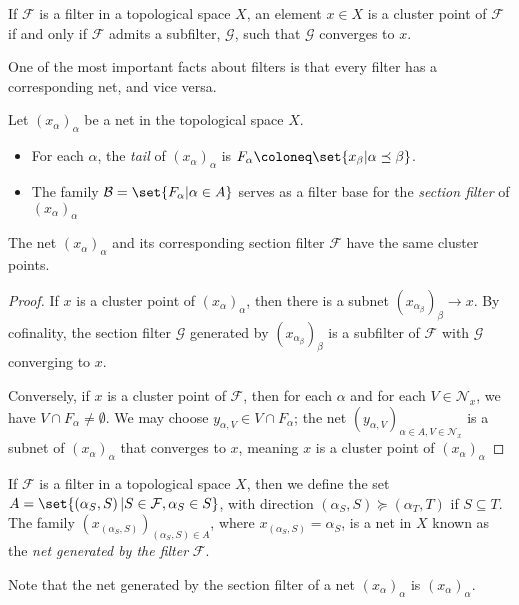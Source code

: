 \documentclass[11pt]{mypackage}
\begin{document}
\begin{theorem}
  If $\mathcal{F}$ is a filter in a topological space $X$, an element $x\in X$ is a cluster point of $\mathcal{F}$ if and only if $\mathcal{F}$ admits a subfilter, $\mathcal{G}$, such that $\mathcal{G}$ converges to $x$.
\end{theorem}
One of the most important facts about filters is that every filter has a corresponding net, and vice versa.
\begin{definition}
  Let $\left( x_{\alpha} \right)_{\alpha}$ be a net in the topological space $X$.
  \begin{itemize}
    \item For each $\alpha$, the \textit{tail} of $\left( x_{\alpha} \right)_{\alpha}$ is $F_{\alpha}\coloneq \set{x_{\beta} | \alpha\preceq \beta}$.
    \item The family $\mathcal{B} = \set{F_{\alpha} | \alpha\in A}$ serves as a filter base for the \textit{section filter} of $\left( x_{\alpha} \right)_{\alpha}$
  \end{itemize}
\end{definition}
\begin{theorem}
  The net $\left( x_{\alpha} \right)_{\alpha}$ and its corresponding section filter $\mathcal{F}$ have the same cluster points.
\end{theorem}
\begin{proof}
  If $x$ is a cluster point of $\left( x_{\alpha} \right)_{\alpha}$, then there is a subnet $\left( x_{\alpha_{\beta}} \right)_{\beta}\rightarrow x$. By cofinality, the section filter $\mathcal{G}$ generated by $\left( x_{\alpha_{\beta}} \right)_{\beta}$ is a subfilter of $\mathcal{F}$ with $\mathcal{G}$ converging to $x$.\newline

  Conversely, if $x$ is a cluster point of $\mathcal{F}$, then for each $\alpha$ and for each $V\in \mathcal{N}_x$, we have $V\cap F_{\alpha}\neq \emptyset$. We may choose $y_{\alpha,V}\in V\cap F_{\alpha}$; the net $\left( y_{\alpha,V} \right)_{\alpha\in A,V\in \mathcal{N}_x}$ is a subnet of $\left( x_{\alpha} \right)_{\alpha}$ that converges to $x$, meaning $x$ is a cluster point of $\left( x_{\alpha} \right)_{\alpha}$
\end{proof}
\begin{definition}
  If $\mathcal{F}$ is a filter in a topological space $X$, then we define the set $A = \set{\left( \alpha_S ,S \right) | S\in \mathcal{F},\alpha_S\in S}$, with direction $\left( \alpha_S,S \right)\succeq \left( \alpha_T,T \right)$ if $S\subseteq T$. The family $\left( x_{\left( \alpha_S,S \right)} \right)_{\left( \alpha_S,S \right)\in A}$, where $x_{\left( \alpha_S,S \right)} = \alpha_S$, is a net in $X$ known as the \textit{net generated by the filter} $\mathcal{F}$.
\end{definition}
  Note that the net generated by the section filter of a net $\left( x_{\alpha} \right)_{\alpha}$ is $\left( x_{\alpha} \right)_{\alpha}$.\newline
\end{document}
